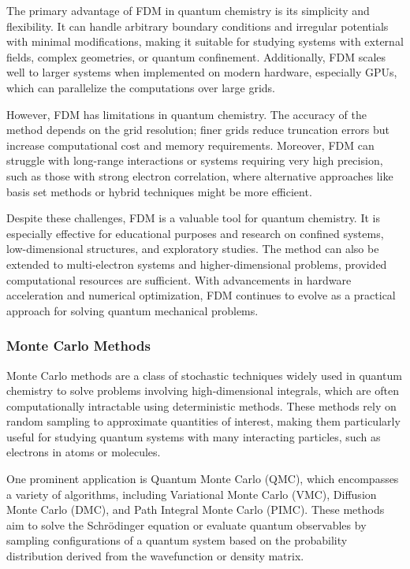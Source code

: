 The primary advantage of FDM in quantum chemistry is its simplicity and flexibility. It can handle arbitrary boundary conditions and irregular potentials with minimal modifications, making it suitable for studying systems with external fields, complex geometries, or quantum confinement. Additionally, FDM scales well to larger systems when implemented on modern hardware, especially GPUs, which can parallelize the computations over large grids.

However, FDM has limitations in quantum chemistry. The accuracy of the method depends on the grid resolution; finer grids reduce truncation errors but increase computational cost and memory requirements. Moreover, FDM can struggle with long-range interactions or systems requiring very high precision, such as those with strong electron correlation, where alternative approaches like basis set methods or hybrid techniques might be more efficient.

Despite these challenges, FDM is a valuable tool for quantum chemistry. It is especially effective for educational purposes and research on confined systems, low-dimensional structures, and exploratory studies. The method can also be extended to multi-electron systems and higher-dimensional problems, provided computational resources are sufficient. With advancements in hardware acceleration and numerical optimization, FDM continues to evolve as a practical approach for solving quantum mechanical problems.%

\subsubsection{Monte Carlo Methods}

Monte Carlo methods are a class of stochastic techniques widely used in quantum chemistry to solve problems involving high-dimensional integrals, which are often computationally intractable using deterministic methods. These methods rely on random sampling to approximate quantities of interest, making them particularly useful for studying quantum systems with many interacting particles, such as electrons in atoms or molecules.

One prominent application is Quantum Monte Carlo (QMC), which encompasses a variety of algorithms, including Variational Monte Carlo (VMC), Diffusion Monte Carlo (DMC), and Path Integral Monte Carlo (PIMC). These methods aim to solve the Schrödinger equation or evaluate quantum observables by sampling configurations of a quantum system based on the probability distribution derived from the wavefunction or density matrix.

